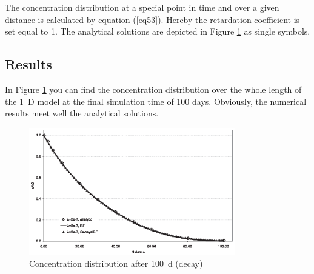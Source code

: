 The concentration distribution at a special point in time and over a given distance is calculated by equation (\ref{eq53}). Hereby the retardation coefficient is set equal to 1. The analytical solutions are depicted in Figure \ref{fig52} as single symbols.

\subsection{Results}

In Figure \ref{fig52} you can find the concentration distribution over the whole length of the 1~D model at the final simulation time of 100 days. Obviously, the numerical results meet well the analytical solutions.

\begin{figure}[htbp]
\centering
\includegraphics[width=0.8\textwidth]{PART_II/C/fig52.eps}
\caption{Concentration distribution after 100~d (decay)}
\label{fig52}
\end{figure}
